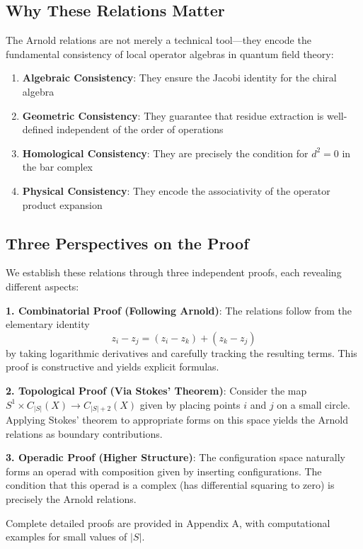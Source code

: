 \subsection{Why These Relations Matter}

The Arnold relations are not merely a technical tool—they encode the fundamental consistency of local operator algebras in quantum field theory:

\begin{enumerate}
\item \textbf{Algebraic Consistency}: They ensure the Jacobi identity for the chiral algebra
\item \textbf{Geometric Consistency}: They guarantee that residue extraction is well-defined independent of the order of operations
\item \textbf{Homological Consistency}: They are precisely the condition for $d^2 = 0$ in the bar complex
\item \textbf{Physical Consistency}: They encode the associativity of the operator product expansion
\end{enumerate}

\subsection{Three Perspectives on the Proof}

We establish these relations through three independent proofs, each revealing different aspects:

\textbf{1. Combinatorial Proof (Following Arnold)}:
The relations follow from the elementary identity
$$z_i - z_j = (z_i - z_k) + (z_k - z_j)$$
by taking logarithmic derivatives and carefully tracking the resulting terms. This proof is constructive and yields explicit formulas.

\textbf{2. Topological Proof (Via Stokes' Theorem)}:
Consider the map $S^1 \times C_{|S|}(X) \to C_{|S|+2}(X)$ given by placing points $i$ and $j$ on a small circle. Applying Stokes' theorem to appropriate forms on this space yields the Arnold relations as boundary contributions.

\textbf{3. Operadic Proof (Higher Structure)}:
The configuration space naturally forms an operad with composition given by inserting configurations. The condition that this operad is a complex (has differential squaring to zero) is precisely the Arnold relations.

Complete detailed proofs are provided in Appendix A, with computational examples for small values of $|S|$.


